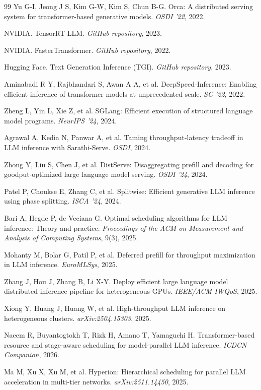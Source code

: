 \documentclass[11pt]{article}
\begin{document}
\begin{thebibliography}{99}
 Yu G-I, Jeong J S, Kim G-W, Kim S, Chun B-G. Orca: A distributed serving system for transformer-based generative models. \emph{OSDI '22}, 2022.

 NVIDIA. TensorRT-LLM. \emph{GitHub repository}, 2023.

 NVIDIA. FasterTransformer. \emph{GitHub repository}, 2022.

 Hugging Face. Text Generation Inference (TGI). \emph{GitHub repository}, 2023.

 Aminabadi R Y, Rajbhandari S, Awan A A, et al. DeepSpeed-Inference: Enabling efficient inference of transformer models at unprecedented scale. \emph{SC '22}, 2022.

 Zheng L, Yin L, Xie Z, et al. SGLang: Efficient execution of structured language model programs. \emph{NeurIPS '24}, 2024.

 Agrawal A, Kedia N, Panwar A, et al. Taming throughput-latency tradeoff in LLM inference with Sarathi-Serve. \emph{OSDI}, 2024.

 Zhong Y, Liu S, Chen J, et al. DistServe: Disaggregating prefill and decoding for goodput-optimized large language model serving. \emph{OSDI '24}, 2024.

 Patel P, Choukse E, Zhang C, et al. Splitwise: Efficient generative LLM inference using phase splitting. \emph{ISCA '24}, 2024.

 Bari A, Hegde P, de Veciana G. Optimal scheduling algorithms for LLM inference: Theory and practice. \emph{Proceedings of the ACM on Measurement and Analysis of Computing Systems}, 9(3), 2025.

 Mohanty M, Bolar G, Patil P, et al. Deferred prefill for throughput maximization in LLM inference. \emph{EuroMLSys}, 2025.

 Zhang J, Hou J, Zhang B, Li X-Y. Deploy efficient large language model distributed inference pipeline for heterogeneous GPUs. \emph{IEEE/ACM IWQoS}, 2025.

 Xiong Y, Huang J, Huang W, et al. High-throughput LLM inference on heterogeneous clusters. \emph{arXiv:2504.15303}, 2025.

 Naeem R, Buyantogtokh T, Rizk H, Amano T, Yamaguchi H. Transformer-based resource and stage-aware scheduling for model-parallel LLM inference. \emph{ICDCN Companion}, 2026.

 Ma M, Xu X, Xu M, et al. Hyperion: Hierarchical scheduling for parallel LLM acceleration in multi-tier networks. \emph{arXiv:2511.14450}, 2025.


\end{thebibliography}
\end{document}
